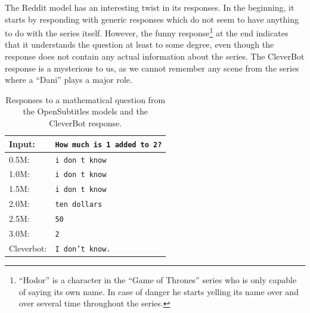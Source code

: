 The Reddit model has an interesting twist in its responses. In the beginning, it starts by responding with generic responses which do not seem to have anything to do with the series itself. However, the funny response\footnote{``Hodor'' is a character in the ``Game of Thrones'' series who is only capable of saying its own name. In case of danger he starts yelling its name over and over several time throughout the series.} at the end indicates that it understands the question at least to some degree, even though the response does not contain any actual information about the series. The CleverBot response is a mysterious to us, as we cannot remember any scene from the series where a ``Dani'' plays a major role.
\\
\begin{table}[H]
	\centering
	\begin{adjustbox}{max width=\textwidth}
		\begin{tabular}{ll}
			\toprule
			Input: 	& \texttt{How much is 1 added to 2?}\\
			\midrule
			0.5M: 	& \texttt{i don t know}\\
			1.0M: 	& \texttt{i don t know}\\
			1.5M:	& \texttt{i don t know}\\
			2.0M:	& \texttt{ten dollars}\\
			2.5M:	& \texttt{50}\\
			3.0M:	& \texttt{2}\\
			Cleverbot:	& \texttt{I don't know.}\\
			\bottomrule
		\end{tabular}
	\end{adjustbox}
	\caption{Responses to a mathematical question from the OpenSubtitles models and the CleverBot response.}
	\label{results:example5_output:OpenSubtitle_compared}
\end{table}

